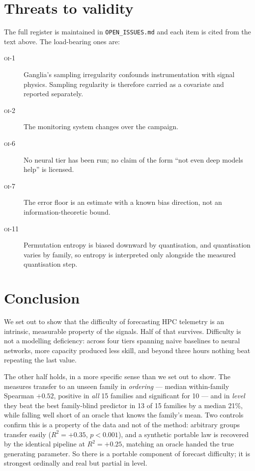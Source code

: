 \documentclass[11pt,a4paper]{article}
\newcommand{\num}[1]{#1}
\newcommand{\oi}[1]{\textsc{oi-#1}}
\begin{document}
\section{Threats to validity}
\label{sec:threats}

The full register is maintained in \texttt{OPEN\_ISSUES.md} and each item is
cited from the text above. The load-bearing ones are:

\begin{description}
  \item[\oi{1}] Ganglia's sampling irregularity confounds instrumentation with
        signal physics. Sampling regularity is therefore carried as a covariate
        and reported separately.
  \item[\oi{2}] The monitoring system changes over the campaign.
  \item[\oi{6}] No neural tier has been run; no claim of the form ``not even
        deep models help'' is licensed.
  \item[\oi{7}] The error floor is an estimate with a known bias direction, not
        an information-theoretic bound.
  \item[\oi{11}] Permutation entropy is biased downward by quantisation, and
        quantisation varies by family, so entropy is interpreted only alongside
        the measured quantisation step.
\end{description}

\section{Conclusion}

We set out to show that the difficulty of forecasting HPC telemetry is an
intrinsic, measurable property of the signals. Half of that survives. Difficulty
is not a modelling deficiency: across four tiers spanning naive baselines to
neural networks, more capacity produced less skill, and beyond three hours
nothing beat repeating the last value.

The other half holds, in a more specific sense than we set out to show. The
measures transfer to an unseen family in \emph{ordering} --- median
within-family Spearman \(+0.52\), positive in \emph{all} \num{15} families
and significant for \num{10} --- and in \emph{level} they beat the best
family-blind predictor in \num{13} of \num{15} families by a median \num{21}\%,
while falling well short of an oracle that knows the family's mean. Two controls
confirm this is a property of the data and not of the method: arbitrary groups
transfer easily (\(R^2 = +0.35\), \(p<0.001\)), and a synthetic portable law is
recovered by the identical pipeline at \(R^2 = +0.25\), matching an oracle
handed the true generating parameter. So there is a portable component of
forecast difficulty; it is strongest ordinally and real but partial in level.
\end{document}
